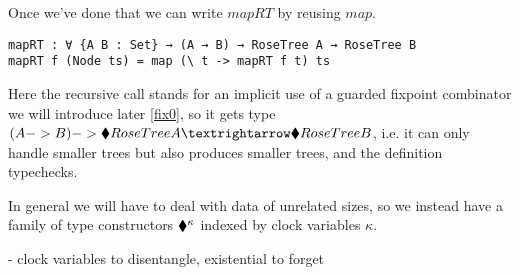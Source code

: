 \documentclass[cm]{sigplanconf}
\begin{document}
Once we've done that we can write $mapRT$ by reusing $map$.
\begin{verbatim}
mapRT : ∀ {A B : Set} → (A → B) → RoseTree A → RoseTree B
mapRT f (Node ts) = map (\ t -> mapRT f t) ts
\end{verbatim}

Here the recursive call stands for an implicit use of a guarded
fixpoint combinator we will introduce later \ref{fix0}, so it gets
type $(A -> B) -> \trib RoseTree A → \trib RoseTree B$, i.e. it can
only handle smaller trees but also produces smaller trees, and the
definition typechecks.

In general we will have to deal with data of unrelated sizes, so we
instead have a family of type constructors $\blacklozenge^\kappa$ indexed by
clock variables $\kappa$.

- clock variables to disentangle, existential to forget

      

\end{document}
